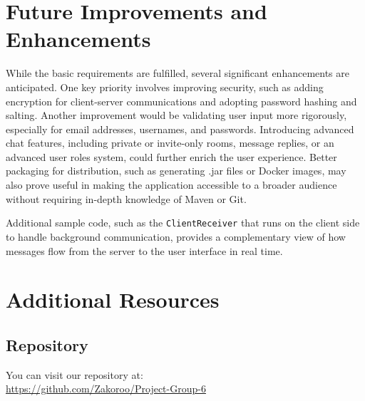 \documentclass[12pt,a4paper]{report}
\begin{document}
\chapter{Future Improvements and Enhancements}
While the basic requirements are fulfilled, several significant enhancements
are anticipated. One key priority involves improving security, such as adding
encryption for client-server communications and adopting password hashing and
salting. Another improvement would be validating user input more rigorously,
especially for email addresses, usernames, and passwords. Introducing advanced
chat features, including private or invite-only rooms, message replies, or an
advanced user roles system, could further enrich the user experience. Better
packaging for distribution, such as generating .jar files or Docker images, may
also prove useful in making the application accessible to a broader audience
without requiring in-depth knowledge of Maven or Git.



Additional sample code, such as the \texttt{ClientReceiver} that runs on the
client side to handle background communication, provides a complementary view
of how messages flow from the server to the user interface in real time.

\appendix
\chapter{Additional Resources}
\section*{Repository}
You can visit our repository at: \\
\hyperlink{https://github.com/Zakoroo/Project-Group-6}{https://github.com/Zakoroo/Project-Group-6}
\end{document}
